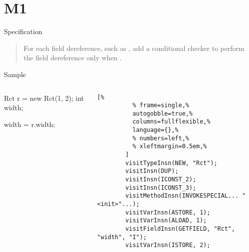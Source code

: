 \section{M1}

\begin{frame}{Specification}
  \begin{quotation}
    For each field dereference, such as , add a conditional checker to perform the field dereference only when .
  \end{quotation}
\end{frame}

\begin{frame}[fragile]{Sample}
  \begin{columns}
    \begin{column}{0.35\textwidth}
      \begin{Java}[%
        ]
        Rct r = new Rct(1, 2);
        int width;

        width = r.width;
      \end{Java}
    \end{column}
    \begin{column}{0.60\textwidth}
      \small
      \begin{lstlisting}[%
          % frame=single,%
          autogobble=true,%
          columns=fullflexible,%
          language={},%
          % numbers=left,%
          % xleftmargin=0.5em,%
        ]
        visitTypeInsn(NEW, "Rct");
        visitInsn(DUP);
        visitInsn(ICONST_2);
        visitInsn(ICONST_3);
        visitMethodInsn(INVOKESPECIAL... "<init>"...);
        visitVarInsn(ASTORE, 1);
        visitVarInsn(ALOAD, 1);
        visitFieldInsn(GETFIELD, "Rct", "width", "I");
        visitVarInsn(ISTORE, 2);
    \end{lstlisting}
    \end{column}
  \end{columns}
\end{frame}

